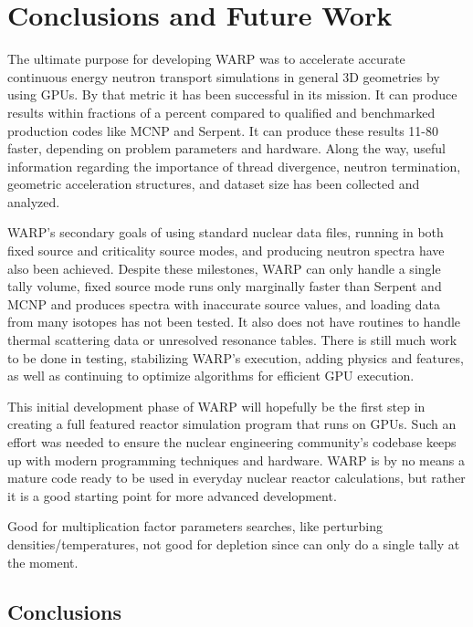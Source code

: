 \chapter{Conclusions and Future Work}
\label{chap:conclusions}

The ultimate purpose for developing WARP was to accelerate accurate continuous energy neutron transport simulations in general 3D geometries by using GPUs.  By that metric it has been successful in its mission.  It can produce results within fractions of a percent compared to qualified and benchmarked production codes like MCNP and Serpent.  It can produce these results 11-80 faster, depending on problem parameters and hardware.  Along the way, useful information regarding the importance of thread divergence, neutron termination, geometric acceleration structures, and dataset size has been collected and analyzed.

WARP's secondary goals of using standard nuclear data files, running in both fixed source and criticality source modes, and producing neutron spectra have also been achieved.  Despite these milestones, WARP can only handle a single tally volume, fixed source mode runs only marginally faster than Serpent and MCNP and produces spectra with inaccurate source values, and loading data from many isotopes has not been tested.  It also does not have routines to handle thermal scattering data or unresolved resonance tables. There is still much work to be done in testing, stabilizing WARP's execution, adding physics and features, as well as continuing to optimize algorithms for efficient GPU execution.

This initial development phase of WARP will hopefully be the first step in creating a full featured reactor simulation program that runs on GPUs.  Such an effort was needed to ensure the nuclear engineering community's codebase keeps up with modern programming techniques and hardware.  WARP is by no means a mature code ready to be used in everyday nuclear reactor calculations, but rather it is a good starting point for more advanced development.  

Good for multiplication factor parameters searches, like perturbing densities/temperatures, not good for depletion since can only do a single tally at the moment.


\section{Conclusions}


